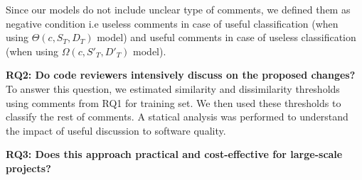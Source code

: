 Since our models do not include unclear type of comments, we defined them as negative condition i.e useless comments in case of useful classification (when using $\Theta(c,S_T,D_T)$ model) and useful comments in case of useless classification (when using $\Omega(c,S'_T,D'_T)$ model).


%


\noindent \textbf{RQ2: Do code reviewers intensively discuss on the proposed changes?}\\
\indent To answer this question, we estimated similarity and dissimilarity thresholds using comments from RQ1 for training set. We then used these thresholds to classify the rest of comments. A statical analysis was performed to understand the impact of useful discussion to software quality.

\noindent \textbf{RQ3: Does this approach practical and cost-effective for large-scale projects?}\\
\indent












